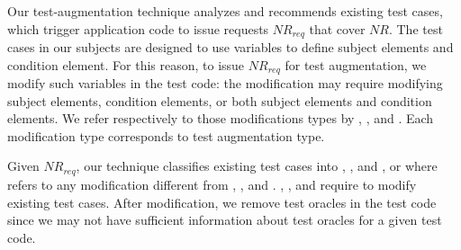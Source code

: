 Our test-augmentation technique analyzes and recommends existing test cases, which trigger
application code to issue requests $NR_{req}$ that cover $NR$. The test cases in our subjects are designed to use variables to define subject elements and condition element. For this reason, 
to issue $NR_{req}$ for test augmentation, we modify such variables in the test code: the modification may require 
modifying subject elements, condition elements, or both subject elements and condition elements. We refer respectively to those modifications types by 
 , , and . Each modification type corresponds to test augmentation type. 

Given $NR_{req}$, our technique classifies existing test cases into , , and ,
or  where  refers to any modification different from , , and . 
, , and  require to modify existing test cases. After modification,
we remove test oracles in the test code since we may not have sufficient information about test oracles for a given test code.


 

